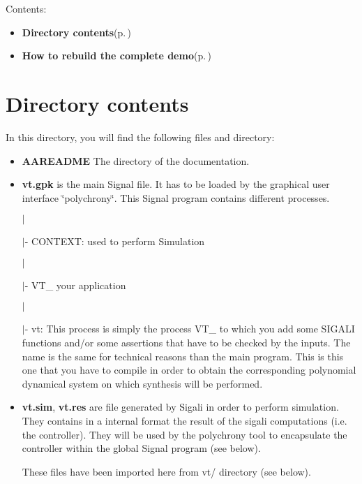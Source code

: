 Contents:\begin{itemize}
\item {\bf Directory contents}{\rm (p.\,\pageref{index_sectA})}\item {\bf How to rebuild the complete demo}{\rm (p.\,\pageref{index_sectB})}\end{itemize}
\section{Directory contents}\label{index_sectA}
In this directory, you will find the following files and directory:

\begin{itemize}
\item {\bf AAREADME} The directory of the documentation.\end{itemize}


\begin{itemize}
\item {\bf vt.gpk} is the main Signal file. It has to be loaded by the graphical user interface \char`\"{}polychrony\char`\"{}. This Signal program contains different processes. \par
 $|$\par
 $|$- CONTEXT: used to perform Simulation \par
 $|$\par
 $|$- VT\_ your application\par
 $|$\par
 $|$- vt: This process is simply the process VT\_ to which you add some SIGALI functions and/or some assertions that have to be checked by the inputs. The name is the same for technical reasons than the main program. This is this one that you have to compile in order to obtain the corresponding polynomial dynamical system on which synthesis will be performed.\end{itemize}


\begin{itemize}
\item {\bf vt.sim}, {\bf vt.res} are file generated by Sigali in order to perform simulation. They contains in a internal format the result of the sigali computations (i.e. the controller). They will be used by the polychrony tool to encapsulate the controller within the global Signal program (see below). \par
 These files have been imported here from vt/ directory (see below).\end{itemize}


